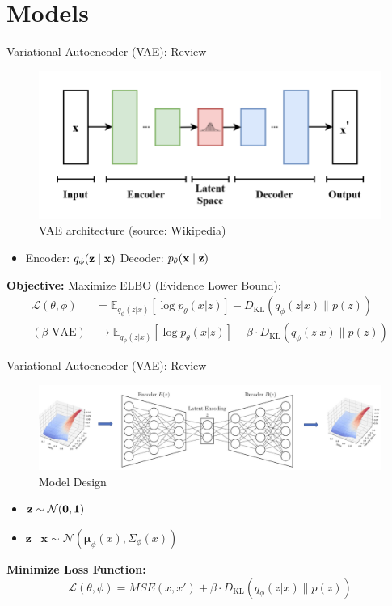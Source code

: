 \documentclass{beamer}
\begin{document}
\section{Models}

\begin{frame}{Variational Autoencoder (VAE): Review}
    \begin{figure}
    \centering
    \includegraphics[width=0.6\linewidth]{docs/proposal/img/vaewiki.png}
    \caption{VAE architecture (source: Wikipedia)}
    \label{fig:vaewiki}
\end{figure}
\begin{itemize}
    \item Encoder: $q_\phi(\bf{z}\mid \bf{x})$ \quad Decoder: $p_\theta(\bf{x}\mid \bf{z})$

\end{itemize}
\textbf{Objective:} Maximize ELBO (Evidence Lower Bound):
\begin{align*}
\mathcal{L}(\theta, \phi) &= \mathbb{E}_{q_\phi(z|x)}[\log p_\theta(x|z)] - D_{\text{KL}}(q_\phi(z|x) \parallel p(z))\\
(\beta\text{-VAE})&\rightarrow \mathbb{E}_{q_\phi(z|x)}[\log p_\theta(x|z)] - \beta \cdot D_{\text{KL}}(q_\phi(z|x) \parallel p(z))
\end{align*}
\end{frame}


\begin{frame}{Variational Autoencoder (VAE): Review}

\begin{figure}
    \centering
    \includegraphics[width=0.85\linewidth]{docs/slides/img/model_design_full.png}
    \caption{Model Design}
\end{figure}

\begin{itemize}
    \item $\bf{z} \sim \mathcal{N}(0,\bf{1})$
    \item $\mathbf{z}\mid \mathbf{x}\sim \mathcal{N}(\mathbf{\mu}_\phi(x), \Sigma_\phi(x))$
\end{itemize}
\textbf{Minimize Loss Function:}
$$\mathcal{L}(\theta, \phi) = MSE(x, x') + \beta \cdot D_{\text{KL}}(q_\phi(z|x) \parallel p(z))$$
\end{frame}
\end{document}
